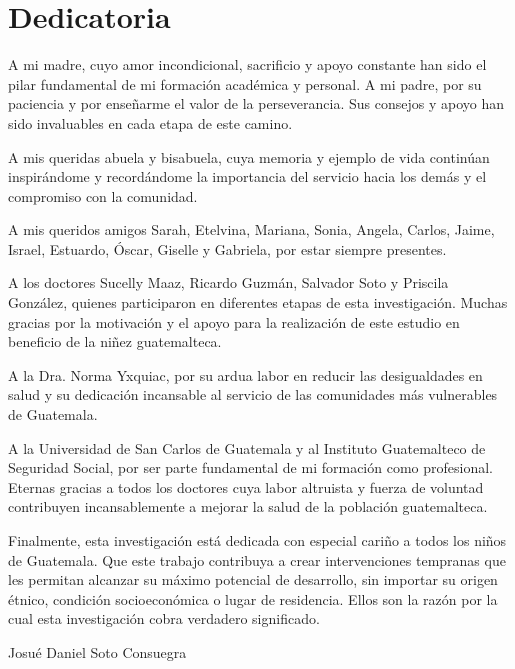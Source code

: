 \chapter*{Dedicatoria}
A mi madre, cuyo amor incondicional, sacrificio y apoyo constante han sido el 
pilar fundamental de mi formación académica y personal. A mi padre, por su 
paciencia y por enseñarme el valor de la perseverancia. Sus consejos y apoyo 
han sido invaluables en cada etapa de este camino.

A mis queridas abuela y bisabuela, cuya memoria y ejemplo de vida continúan 
inspirándome y recordándome la importancia del servicio hacia los demás y el 
compromiso con la comunidad.

A mis queridos amigos Sarah, Etelvina, Mariana, Sonia, Angela, Carlos, Jaime, 
Israel, Estuardo, Óscar, Giselle y Gabriela, por estar siempre presentes.

A los doctores Sucelly Maaz, Ricardo Guzmán, Salvador Soto y Priscila González, 
quienes participaron en diferentes etapas de esta investigación. Muchas gracias 
por la motivación y el apoyo para la realización de este estudio en beneficio 
de la niñez guatemalteca.

A la Dra. Norma Yxquiac, por su ardua labor en reducir las desigualdades en 
salud y su dedicación incansable al servicio de las comunidades más vulnerables 
de Guatemala.

A la Universidad de San Carlos de Guatemala y al Instituto Guatemalteco de 
Seguridad Social, por ser parte fundamental de mi formación como profesional. 
Eternas gracias a todos los doctores cuya labor altruista y fuerza de voluntad 
contribuyen incansablemente a mejorar la salud de la población guatemalteca.

Finalmente, esta investigación está dedicada con especial cariño a todos los 
niños de Guatemala. Que este trabajo contribuya a crear intervenciones tempranas 
que les permitan alcanzar su máximo potencial de desarrollo, sin importar su 
origen étnico, condición socioeconómica o lugar de residencia. Ellos son la 
razón por la cual esta investigación cobra verdadero significado.

\vspace{1cm}

\begin{flushright}
Josué Daniel Soto Consuegra
\end{flushright}
